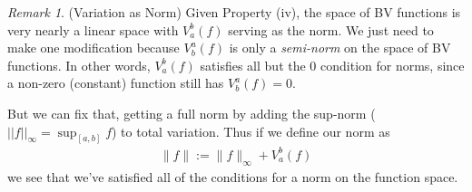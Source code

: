 \documentclass[12pt]{book}
\numberwithin{equation}{section} %
\theoremstyle{plain}
\theoremstyle{definition}
\theoremstyle{remark}
\newtheorem*{rmk}{Remark}
\begin{document}
\begin{rmk}(Variation as Norm)
Given Property (iv), the space of BV functions is very nearly a linear
space with $V_a^b(f)$ serving as the norm.
We just need to make one modification because $V^a_b(f)$ is only a
\emph{semi-norm} on the space of BV functions. In other words,
$V^b_a(f)$ satisfies  all but the 0 condition for norms, since a
non-zero (constant) function still has $V^a_b(f)=0$.

But we can fix that, getting a full norm by adding the sup-norm
($||f||_\infty = \sup_{[a,b]} f$) to total variation. Thus if we define
our norm as
\begin{align*}
  \lVert f \rVert := \lVert f\rVert_\infty + V_a^b(f)
\end{align*}
we see that we've satisfied all of the conditions for a norm on the
function space.
\end{rmk}
\end{document}
